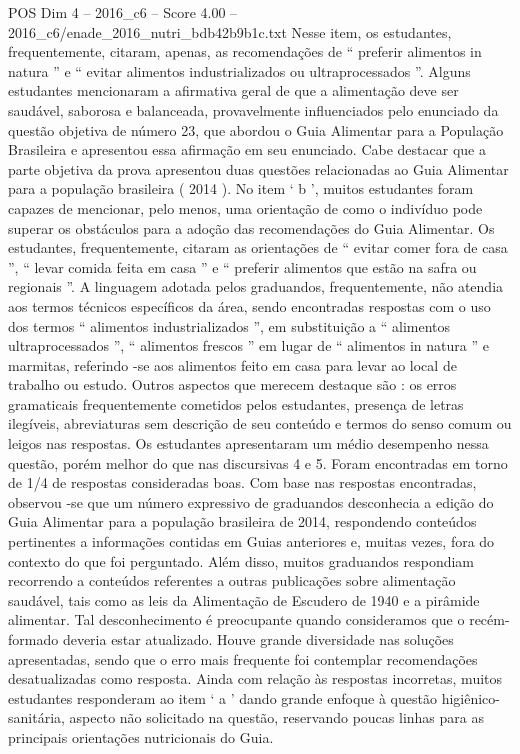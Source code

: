 \begin{textsample}{POS Dim 4 – 2016\_c6 – Score 4.00 – 2016\_c6/enade\_2016\_nutri\_bdb42b9b1c.txt}
Nesse item, os estudantes, frequentemente, citaram, apenas, as recomendações de “ preferir alimentos in natura ” e “ evitar alimentos industrializados ou ultraprocessados ”.
Alguns estudantes mencionaram a afirmativa geral de que a alimentação deve ser saudável, saborosa e balanceada, provavelmente influenciados pelo enunciado da questão objetiva de número 23, que abordou o Guia Alimentar para a População Brasileira e apresentou essa afirmação em seu enunciado.
Cabe destacar que a parte objetiva da prova apresentou duas questões relacionadas ao Guia Alimentar para a população brasileira ( 2014 ).
No item ‘ b ’, muitos estudantes foram capazes de mencionar, pelo menos, uma orientação de como o indivíduo pode superar os obstáculos para a adoção das recomendações do Guia Alimentar.
Os estudantes, frequentemente, citaram as orientações de “ evitar comer fora de casa ”, “ levar comida feita em casa ” e “ preferir alimentos que estão na safra ou regionais ”.
A linguagem adotada pelos graduandos, frequentemente, não atendia aos termos técnicos específicos da área, sendo encontradas respostas com o uso dos termos “ alimentos industrializados ”, em substituição a “ alimentos ultraprocessados ”, “ alimentos frescos ” em lugar de “ alimentos in natura ” e marmitas, referindo -se aos alimentos feito em casa para levar ao local de trabalho ou estudo.
Outros aspectos que merecem destaque são : os erros gramaticais frequentemente cometidos pelos estudantes, presença de letras ilegíveis, abreviaturas sem descrição de seu conteúdo e termos do senso comum ou leigos nas respostas.
Os estudantes apresentaram um médio desempenho nessa questão, porém melhor do que nas discursivas 4 e 5.
Foram encontradas em torno de 1/4 de respostas consideradas boas.
Com base nas respostas encontradas, observou -se que um número expressivo de graduandos desconhecia a edição do Guia Alimentar para a população brasileira de 2014, respondendo conteúdos pertinentes a informações contidas em Guias anteriores e, muitas vezes, fora do contexto do que foi perguntado.
Além disso, muitos graduandos respondiam recorrendo a conteúdos referentes a outras publicações sobre alimentação saudável, tais como as leis da Alimentação de Escudero de 1940 e a pirâmide alimentar.
Tal desconhecimento é preocupante quando consideramos que o recém-formado deveria estar atualizado.
Houve grande diversidade nas soluções apresentadas, sendo que o erro mais frequente foi contemplar recomendações desatualizadas como resposta.
Ainda com relação às respostas incorretas, muitos estudantes responderam ao item ‘ a ’ dando grande enfoque à questão higiênico-sanitária, aspecto não solicitado na questão, reservando poucas linhas para as principais orientações nutricionais do Guia.

\end{textsample}
